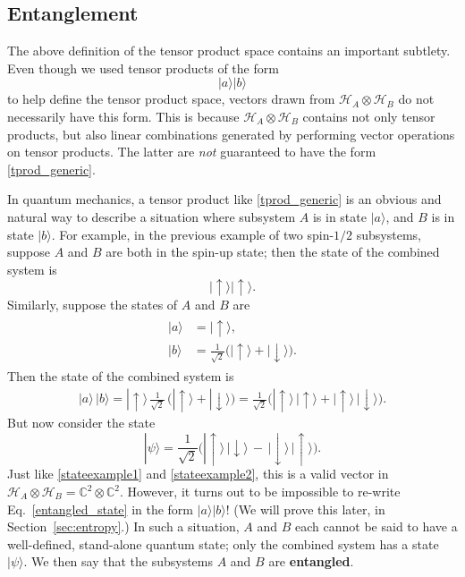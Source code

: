 \documentclass[pra,12pt]{revtex4-2}
\begin{document}
\subsection{Entanglement}

The above definition of the tensor product space contains an important
subtlety.  Even though we used tensor products of the form
\begin{equation}
  |a\rangle |b\rangle
  \label{tprod_generic}
\end{equation}
to help define the tensor product space, vectors drawn from
$\mathscr{H}_A \otimes \mathscr{H}_B$ do not necessarily have this
form.  This is because $\mathscr{H}_A \otimes \mathscr{H}_B$ contains
not only tensor products, but also linear combinations generated by
performing vector operations on tensor products.  The latter are
\textit{not} guaranteed to have the form \eqref{tprod_generic}.

In quantum mechanics, a tensor product like \eqref{tprod_generic} is
an obvious and natural way to describe a situation where subsystem $A$
is in state $|a\rangle$, and $B$ is in state $|b\rangle$.  For
example, in the previous example of two spin-$1/2$ subsystems, suppose
$A$ and $B$ are both in the spin-up state; then the state of the
combined system is
\begin{equation}
  |\!\uparrow\rangle |\!\uparrow\rangle.
  \label{stateexample1}
\end{equation}
Similarly, suppose the states of $A$ and $B$ are
\begin{align}
  \begin{aligned}
  |a\rangle &= |\!\uparrow\rangle,\\
  |b\rangle &= \frac{1}{\sqrt{2}}
  \Big(|\!\uparrow\rangle + |\!\downarrow\rangle\Big).
  \end{aligned}
\end{align}
Then the state of the combined system is
\begin{align}
  |a\rangle\, |b\rangle
  = |\!\uparrow\rangle\, \frac{1}{\sqrt{2}}\,
  \Big(|\!\uparrow\rangle + |\!\downarrow\rangle\Big)
  = \frac{1}{\sqrt{2}} \Big( |\!\uparrow\rangle \, |\!\uparrow\rangle
  + |\!\uparrow\rangle\, |\!\downarrow\rangle \Big).
  \label{stateexample2}
\end{align}
But now consider the state
\begin{equation}
  |\psi\rangle = \frac{1}{\sqrt{2}}
  \Big(|\!\uparrow\rangle\, |\!\downarrow\rangle
  \,-\, |\!\downarrow\rangle \, |\!\uparrow\rangle\Big).
  \label{entangled_state}
\end{equation}
Just like \eqref{stateexample1} and \eqref{stateexample2}, this is a
valid vector in $\mathscr{H}_A \otimes \mathscr{H}_B =
\mathbb{C}^2\otimes\mathbb{C}^2$.  However, it turns out to be
impossible to re-write Eq.~\eqref{entangled_state} in the form
$|a\rangle|b\rangle$!  (We will prove this later, in
Section~\ref{sec:entropy}.)  In such a situation, $A$ and $B$ each
cannot be said to have a well-defined, stand-alone quantum state; only
the combined system has a state $|\psi\rangle$.  We then say that the
subsystems $A$ and $B$ are \textbf{entangled}.
\end{document}
